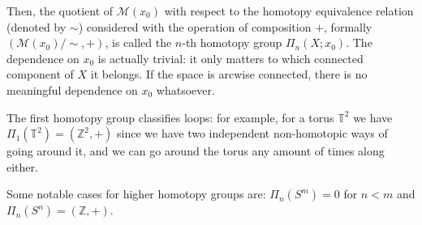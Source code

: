 \documentclass[main.tex]{subfiles}
\begin{document}
Then, the quotient of $\mathcal M(x_0)$ with respect to the homotopy equivalence relation (denoted by $\sim$) considered with the operation of composition $+$, formally $(\mathcal{M}(x_0)/\!\sim, +)$,
is called the \(n\)-th homotopy group \(\Pi_n (X; x_0)\).
The dependence on \(x_0\) is actually trivial: it only matters to which connected component of \(X\) it belongs. If the space is arcwise connected, there is no meaningful dependence on \(x_0 \) whatsoever.

The first homotopy group classifies loops: for example, for a torus $\mathbb T^2 $ we have \(\Pi_{1} (\mathbb{T}^2) = (\mathbb{Z}^2, +)\) since we have two independent non-homotopic  ways of going around it, and we can go around the torus any amount of times along either.

Some notable cases for higher homotopy groups are: \(\Pi_n (S^m) = 0 \) for \(n<m\) and \(\Pi_n (S^n) = (\mathbb Z, +)\).
\end{document}
